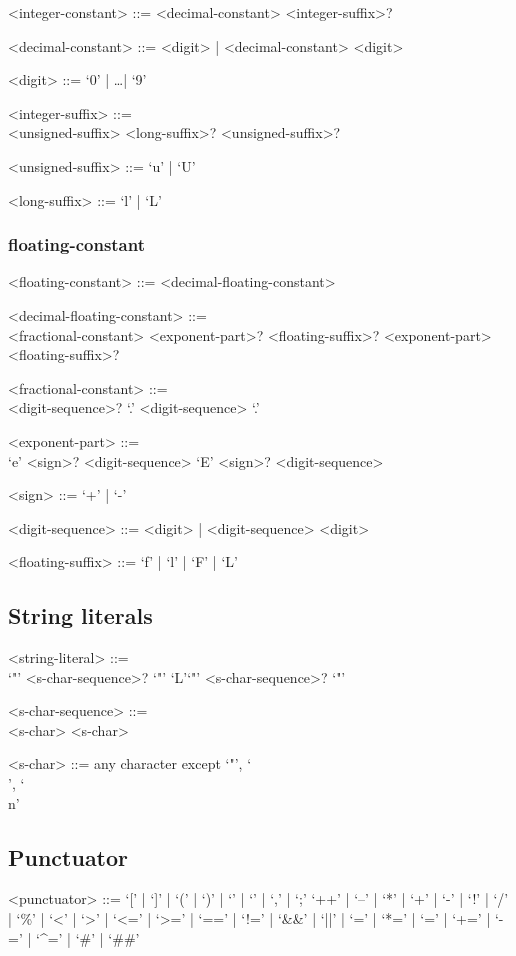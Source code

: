 \documentclass[a4paper]{article}
\begin{document}
\begin{grammar}
	<integer-constant> ::= <decimal-constant> <integer-suffix>?

	<decimal-constant> ::= <digit> | <decimal-constant> <digit>

	<digit> ::= `0' | \dots | `9'

	<integer-suffix> ::= \hfill \\
		<unsigned-suffix> <long-suffix>?
		\alt <long-suffix> <unsigned-suffix>?
	
	<unsigned-suffix> ::= `u' | `U'

	<long-suffix> ::= `l' | `L'
	
\end{grammar}

\subsubsection{floating-constant}

\begin{grammar}
	<floating-constant> ::= <decimal-floating-constant>

	<decimal-floating-constant> ::= \hfill \\
		<fractional-constant> <exponent-part>? <floating-suffix>?
		\alt <digit-sequence> <exponent-part> <floating-suffix>?

	<fractional-constant> ::= \hfill \\ 
		<digit-sequence>? `.' <digit-sequence> 
		\alt <digit-sequence> `.'

	<exponent-part> ::= \hfill \\
		`e' <sign>? <digit-sequence>
		\alt `E' <sign>? <digit-sequence>
	
	<sign> ::= `+' | `-'

	<digit-sequence> ::= <digit> | <digit-sequence> <digit>

	<floating-suffix> ::= `f' | `l' | `F' | `L'
\end{grammar}

\subsection{String literals}

\begin{grammar}
	<string-literal> ::= \hfill \\
		`"' <s-char-sequence>? `"'
			\alt `L'`"' <s-char-sequence>? `"'
	
	<s-char-sequence> ::= \hfill \\ 
		<s-char>
		\alt <s-char-sequence> <s-char>
	
	<s-char> ::= any character except `"', `\\', `\\n'
		\alt <escape-sequence>
\end{grammar}

\subsection{Punctuator}

\begin{grammar}
	<punctuator> ::= `[' | `]' | `(' | `)' | `{' | `}' | `,' | `;'
		`++' | `--' | `*' | `+' | `-' | `!' | `/' | `\%' | `<' | `>' |
		`<=' | `>=' | `==' | `!=' | `&&' | `||' |
		`=' | `*=' | `\/=' | `+=' | `-=' | `^=' |
		`#' | `##'
	
\end{grammar}
	
\end{document}
